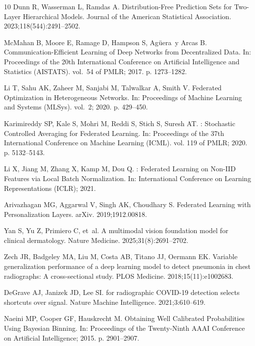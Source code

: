 \documentclass[VANCOUVER,Times1COL]{WileyNJDv5}
\begin{document}
\begin{thebibliography}{10}
Dunn R, Wasserman L, Ramdas A.
\newblock Distribution-Free Prediction Sets for Two-Layer Hierarchical Models.
\newblock Journal of the American Statistical Association.
  2023;118(544):2491--2502.

McMahan B, Moore E, Ramage D, Hampson S, Ag{\"u}era~y Arcas B.
\newblock Communication-Efficient Learning of Deep Networks from Decentralized
  Data.
\newblock In: Proceedings of the 20th International Conference on Artificial
  Intelligence and Statistics (AISTATS). vol.~54 of PMLR; 2017. p. 1273--1282.

Li T, Sahu AK, Zaheer M, Sanjabi M, Talwalkar A, Smith V.
\newblock Federated Optimization in Heterogeneous Networks.
\newblock In: Proceedings of Machine Learning and Systems (MLSys). vol.~2;
  2020. p. 429--450.

Karimireddy SP, Kale S, Mohri M, Reddi S, Stich S, Suresh AT.
: Stochastic Controlled Averaging for Federated Learning.
\newblock In: Proceedings of the 37th International Conference on Machine
  Learning (ICML). vol. 119 of PMLR; 2020. p. 5132--5143.

Li X, Jiang M, Zhang X, Kamp M, Dou Q.
: Federated Learning on Non-{IID} Features via Local Batch
  Normalization.
\newblock In: International Conference on Learning Representations (ICLR);
  2021.

Arivazhagan MG, Aggarwal V, Singh AK, Choudhary S.
\newblock Federated Learning with Personalization Layers.
\newblock arXiv. 2019;1912.00818.

Yan S, Yu Z, Primiero C, et~al.
\newblock A multimodal vision foundation model for clinical dermatology.
\newblock Nature Medicine. 2025;31(8):2691--2702.

Zech JR, Badgeley MA, Liu M, Costa AB, Titano JJ, Oermann EK.
\newblock Variable generalization performance of a deep learning model to
  detect pneumonia in chest radiographs: A cross-sectional study.
\newblock PLOS Medicine. 2018;15(11):e1002683.

DeGrave AJ, Janizek JD, Lee SI.
 for radiographic {COVID-19} detection selects shortcuts over
  signal.
\newblock Nature Machine Intelligence. 2021;3:610--619.

Naeini MP, Cooper GF, Hauskrecht M.
\newblock Obtaining Well Calibrated Probabilities Using {B}ayesian Binning.
\newblock In: Proceedings of the Twenty-Ninth AAAI Conference on Artificial
  Intelligence; 2015. p. 2901--2907.


\end{thebibliography}
\end{document}
